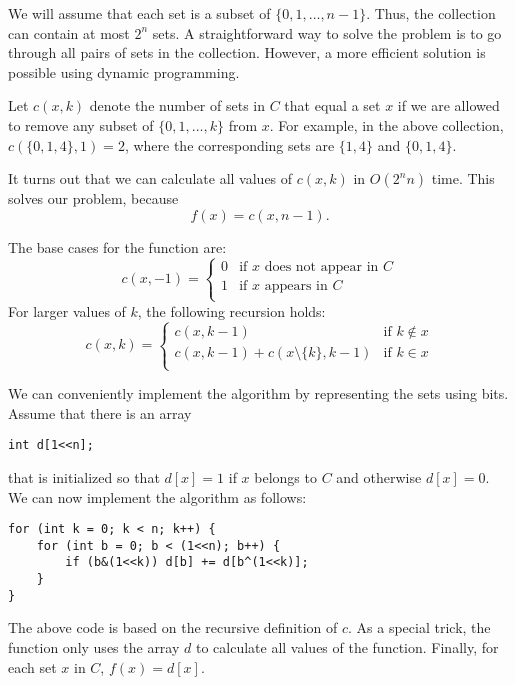 We will assume that each set is
a subset of $\{0,1,\ldots,n-1\}$.
Thus, the collection can contain at most
$2^n$ sets.
A straightforward way to solve the problem
is to go through all pairs of sets in the collection.
However, a more efficient solution is possible
using dynamic programming.

Let $c(x,k)$ denote the number of sets in
$C$ that equal a set $x$
if we are allowed to remove any subset of
$\{0,1,\ldots,k\}$ from $x$.
For example, in the above collection,
$c(\{0,1,4\},1)=2$,
where the corresponding sets are
$\{1,4\}$ and $\{0,1,4\}$.

It turns out that we can calculate all
values of $c(x,k)$ in $O(2^n n)$ time.
This solves our problem, because
\[f(x)=c(x,n-1).\]

The base cases for the function are:
\begin{equation*}
    c(x,-1) = \begin{cases}
               0 & \textrm{if $x$ does not appear in $C$}\\
               1 & \textrm{if $x$ appears in $C$}\\
           \end{cases}
\end{equation*}
For larger values of $k$, the following recursion holds:
\begin{equation*}
    c(x,k) = \begin{cases}
               c(x,k-1)          & \textrm{if $k \notin x$}\\
               c(x,k-1)+c(x \setminus \{k\},k-1)    & \textrm{if $k \in x$}\\
           \end{cases}
\end{equation*}

We can conveniently implement the algorithm by representing
the sets using bits.
Assume that there is an array
\begin{lstlisting}
int d[1<<n];
\end{lstlisting}
that is initialized so that $d[x]=1$ if $x$ belongs to $C$
and otherwise $d[x]=0$.
We can now implement the algorithm as follows:

\begin{lstlisting}
for (int k = 0; k < n; k++) {
    for (int b = 0; b < (1<<n); b++) {
        if (b&(1<<k)) d[b] += d[b^(1<<k)];
    }
}
\end{lstlisting}
The above code is based on the recursive definition
of $c$. As a special trick, the function only uses
the array $d$ to calculate all values of the function.
Finally, for each set $x$ in $C$, $f(x)=d[x]$.


